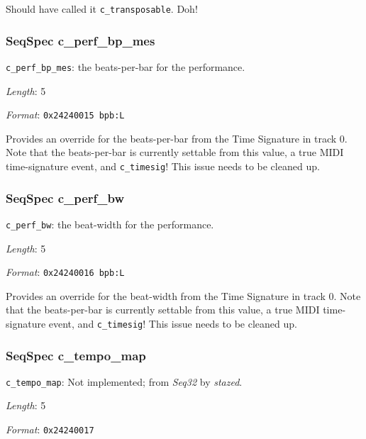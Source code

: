    Should have called it \texttt{c\_transposable}. Doh!

\subsubsection{SeqSpec c\_perf\_bp\_mes}
\label{subsubsec:midi_format_track_seqspec_perf_bp_mes}

   \begin{description}
      \item \texttt{c\_perf\_bp\_mes}:
         the beats-per-bar for the performance.
      \item \textsl{Length}: 5
      \item \textsl{Format}: \texttt{0x24240015 bpb:L}
   \end{description}

   Provides an override for the beats-per-bar from the Time Signature in track
   0.  Note that the beats-per-bar is currently settable from this value,
   a true MIDI time-signature event, and \texttt{c\_timesig}!
   This issue needs to be cleaned up.

\subsubsection{SeqSpec c\_perf\_bw}
\label{subsubsec:midi_format_track_seqspec_perf_bw}

   \begin{description}
      \item \texttt{c\_perf\_bw}:
         the beat-width for the performance.
      \item \textsl{Length}: 5
      \item \textsl{Format}: \texttt{0x24240016 bpb:L}
   \end{description}

   Provides an override for the beat-width from the Time Signature in track 0.
   Note that the beats-per-bar is currently settable from this value,
   a true MIDI time-signature event, and \texttt{c\_timesig}!
   This issue needs to be cleaned up.

\subsubsection{SeqSpec c\_tempo\_map}
\label{subsubsec:midi_format_track_seqspec_tempo_map}

   \begin{description}
      \item \texttt{c\_tempo\_map}: Not implemented; from \textsl{Seq32} by
         \textsl{stazed}.
      \item \textsl{Length}: 5
      \item \textsl{Format}: \texttt{0x24240017}
   \end{description}


